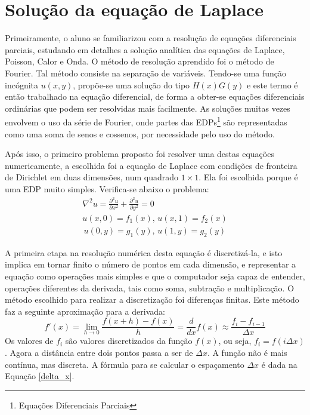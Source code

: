 \documentclass[journal]{IEEEtran}
\begin{document}
\section{Solução da equação de Laplace}
Primeiramente, o aluno se familiarizou com a resolução de equações diferenciais parciais, estudando em detalhes a solução analítica das equações de Laplace, Poisson, Calor e Onda. O método de resolução aprendido foi o método de Fourier. Tal método consiste na separação de variáveis. Tendo-se uma função incógnita $u(x,y)$, propõe-se uma solução do tipo $H(x)G(y)$ e este termo é então trabalhado na equação diferencial, de forma a obter-se equações diferenciais ordinárias que podem ser resolvidas mais facilmente. As soluções muitas vezes envolvem o uso da série de Fourier, onde partes das EDPs\footnote{Equações Diferenciais Parciais} são representadas como uma soma de senos e cossenos, por necessidade pelo uso do método.

Após isso, o primeiro problema proposto foi resolver uma destas equações numericamente, a escolhida foi a equação de Laplace com condições de fronteira de Dirichlet em duas dimensões, num quadrado $1\times 1$. Ela foi escolhida porque é uma EDP muito simples. Verifica-se abaixo o problema:
\begin{eqnarray}
\nabla^2 u=\frac{\partial^2 u}{\partial x^2}+\frac{\partial^2 u}{\partial y^2}=0\label{laplace}\\
u(x,0)=f_1(x),\,u(x,1)=f_2(x)\nonumber \\
\,u(0,y)=g_1(y),\,u(1,y)=g_2(y) \nonumber
\end{eqnarray}

A primeira etapa na resolução numérica desta equação é discretizá-la, e isto implica em tornar finito o número de pontos em cada dimensão, e representar a equação como operações mais simples e que o computador seja capaz de entender, operações diferentes da derivada, tais como soma, subtração e multiplicação. O método escolhido para realizar a discretização foi diferenças finitas. Este método faz a seguinte aproximação para a derivada:
\begin{equation}
f'(x)=\lim_{h\rightarrow 0}\frac{f(x+h)-f(x)}{h}=\frac{d}{dx}f(x)\approx \frac{f_i-f_{i-1}}{\Delta x}
\end{equation}
Os valores de $f_i$ são valores discretizados da função $f(x)$, ou seja, $f_i=f(i\Delta x)$. Agora a distância entre dois pontos passa a ser de $\Delta x$. A função não é mais contínua, mas discreta. A fórmula para se calcular o espaçamento $\Delta x$ é dada na Equação \ref{delta_x}.
\end{document}
